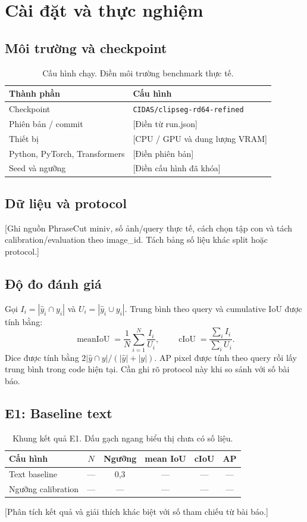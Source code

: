 \chapter{Cài đặt và thực nghiệm}
\section{Môi trường và checkpoint}
\begin{table}[H]
\centering
\caption{Cấu hình chạy. Điền môi trường benchmark thực tế.}
\begin{tabularx}{\textwidth}{@{}l L@{}}
\toprule
Thành phần & Cấu hình \\
\midrule
Checkpoint & \texttt{CIDAS/clipseg-rd64-refined} \\
Phiên bản / commit & [Điền từ run.json] \\
Thiết bị & [CPU / GPU và dung lượng VRAM] \\
Python, PyTorch, Transformers & [Điền phiên bản] \\
Seed và ngưỡng & [Điền cấu hình đã khóa] \\
\bottomrule
\end{tabularx}
\end{table}

\section{Dữ liệu và protocol}
[Ghi nguồn PhraseCut miniv, số ảnh/query thực tế, cách chọn tập con và tách calibration/evaluation theo image\_id. Tách bảng số liệu khác split hoặc protocol.]

\section{Độ đo đánh giá}
Gọi $I_i=|\hat{y}_i\cap y_i|$ và $U_i=|\hat{y}_i\cup y_i|$. Trung bình theo query và cumulative IoU được tính bằng:
\begin{equation}
\operatorname{meanIoU}=\frac{1}{N}\sum_{i=1}^{N}\frac{I_i}{U_i},\qquad
\operatorname{cIoU}=\frac{\sum_i I_i}{\sum_i U_i}.
\end{equation}
Dice được tính bằng $2|\hat{y}\cap y|/(|\hat{y}|+|y|)$. AP pixel được tính theo query rồi lấy trung bình trong code hiện tại. Cần ghi rõ protocol này khi so sánh với số bài báo.

\section{E1: Baseline text}
\begin{table}[H]
\centering
\caption{Khung kết quả E1. Dấu gạch ngang biểu thị chưa có số liệu.}
\label{tab:e1}
\begin{tabular}{@{}lccccc@{}}
\toprule
Cấu hình & $N$ & Ngưỡng & mean IoU & cIoU & AP \\
\midrule
Text baseline & --- & 0,3 & --- & --- & --- \\
Ngưỡng calibration & --- & --- & --- & --- & --- \\
\bottomrule
\end{tabular}
\end{table}
[Phân tích kết quả và giải thích khác biệt với số tham chiếu từ bài báo.]

